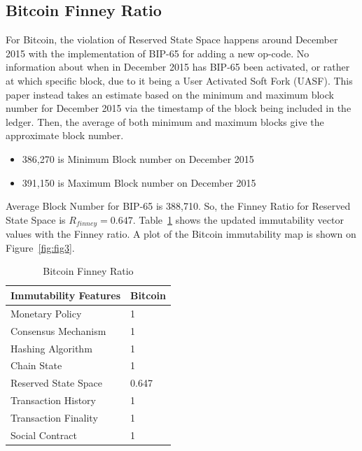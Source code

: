 \documentclass{article}
\begin{document}
\subsection{Bitcoin Finney Ratio}

For Bitcoin, the violation of Reserved State Space happens around December 2015 with the implementation of BIP-65 for adding a new op-code. No information about when in December 2015 has BIP-65 been activated, or rather at which specific block, due to it being a User Activated Soft Fork (UASF). This paper instead takes an estimate based on the minimum and maximum block number for December 2015 via the timestamp of the block being included in the ledger. Then, the average of both minimum and maximum blocks  give the approximate block number.

\begin{itemize}
\item 386,270 is Minimum Block number on December 2015
\item 391,150 is Maximum Block number on December 2015
\end{itemize}
Average Block Number for BIP-65 is 388,710. So, the Finney Ratio for Reserved State Space is $R_{finney} = 0.647$. Table~\ref{tab5:table} shows the updated immutability vector values with the Finney ratio. A plot of the Bitcoin immutability map is shown on Figure~\ref{fig:fig3}.

\begin{table}
 \caption{Bitcoin Finney Ratio}
  \centering
  \begin{tabular}{ll}
    \toprule
    \cmidrule(r){1-2}
    Immutability Features & Bitcoin \\
    \midrule
    Monetary Policy & 1     \\
    Consensus Mechanism & 1     \\
    Hashing Algorithm & 1     \\
    Chain State & 1     \\
    Reserved State Space & 0.647     \\
    Transaction History & 1     \\
    Transaction Finality & 1     \\
    Social Contract & 1     \\
    \bottomrule
  \end{tabular}
  \label{tab5:table}
\end{table}
\end{document}
